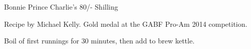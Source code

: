 \begin{recipe}{Bonnie Prince Charlie's 80/- Shilling}

\begin{aboutblock}
Recipe by Michael Kelly. Gold medal at the GABF Pro-Am 2014 competition.
\sourceaha
\end{aboutblock}


\begin{methodandtiming}

\begin{mashsteps}
\end{mashsteps}

\begin{fermentationsteps}
\end{fermentationsteps}

\begin{directions}
Boil  of first runnings for 30 minutes, then add to brew
kettle.
\end{directions}

\end{methodandtiming}

\recipebreak

\begin{ingredientsblock}

\begin{malts}
\end{malts}

\begin{hops}
\end{hops}


\end{ingredientsblock}

\end{recipe}

